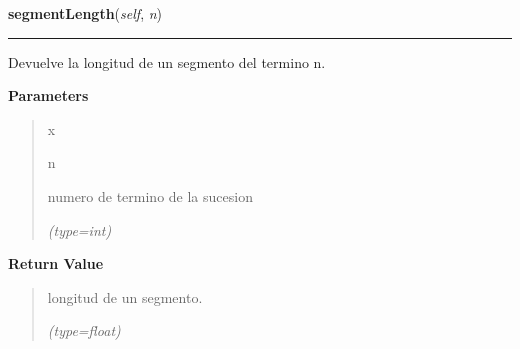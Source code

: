\hspace{.8\funcindent}\begin{boxedminipage}{\funcwidth}

    \raggedright \textbf{segmentLength}(\textit{self}, \textit{n})

    \vspace{-1.5ex}

    \rule{\textwidth}{0.5\fboxrule}
\setlength{\parskip}{2ex}
    Devuelve la longitud de un segmento del termino n.

\setlength{\parskip}{1ex}
      \textbf{Parameters}
      \vspace{-1ex}

      \begin{quote}
        \begin{Ventry}{x}

          \item[n]

          numero de termino de la sucesion

            {\it (type=int)}

        \end{Ventry}

      \end{quote}

      \textbf{Return Value}
    \vspace{-1ex}

      \begin{quote}
      longitud de un segmento.

      {\it (type=float)}

      \end{quote}

    \end{boxedminipage}

    \label{FractalZE:cantor:Cantor:totalLength}

    \vspace{0.5ex}


